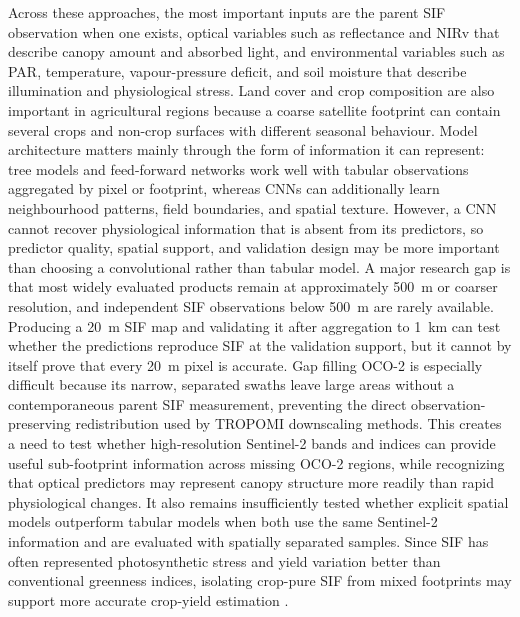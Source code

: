Across these approaches, the most important inputs are the parent SIF observation when one exists, optical variables such as reflectance and NIRv that describe canopy amount and absorbed light, and environmental variables such as PAR, temperature, vapour-pressure deficit, and soil moisture that describe illumination and physiological stress. Land cover and crop composition are also important in agricultural regions because a coarse satellite footprint can contain several crops and non-crop surfaces with different seasonal behaviour. Model architecture matters mainly through the form of information it can represent: tree models and feed-forward networks work well with tabular observations aggregated by pixel or footprint, whereas CNNs can additionally learn neighbourhood patterns, field boundaries, and spatial texture. However, a CNN cannot recover physiological information that is absent from its predictors, so predictor quality, spatial support, and validation design may be more important than choosing a convolutional rather than tabular model. A major research gap is that most widely evaluated products remain at approximately 500~m or coarser resolution, and independent SIF observations below 500~m are rarely available. Producing a 20~m SIF map and validating it after aggregation to 1~km can test whether the predictions reproduce SIF at the validation support, but it cannot by itself prove that every 20~m pixel is accurate. Gap filling OCO-2 is especially difficult because its narrow, separated swaths leave large areas without a contemporaneous parent SIF measurement, preventing the direct observation-preserving redistribution used by TROPOMI downscaling methods. This creates a need to test whether high-resolution Sentinel-2 bands and indices can provide useful sub-footprint information across missing OCO-2 regions, while recognizing that optical predictors may represent canopy structure more readily than rapid physiological changes. It also remains insufficiently tested whether explicit spatial models outperform tabular models when both use the same Sentinel-2 information and are evaluated with spatially separated samples. Since SIF has often represented photosynthetic stress and yield variation better than conventional greenness indices, isolating crop-pure SIF from mixed footprints may support more accurate crop-yield estimation \cite{qiu2022monitoring,song2018satellite,peng2020assessing}.
